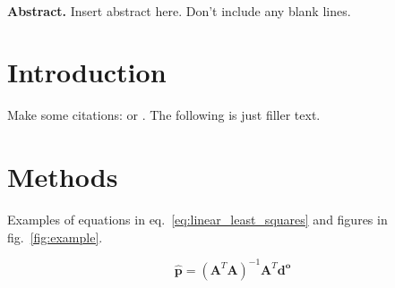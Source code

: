 \documentclass[9pt,twocolumn]{paper}
\begin{document}
\twocolumn[
  \begin{@twocolumnfalse}
    \noindent \textbf{\large \Title{}}
  \end{@twocolumnfalse}
  \vspace{0.7cm}
]
\noindent {\large \Name{}}
\\[0.2cm]
\noindent {\small \Affiliation{}}
\vspace{0.5cm}

\noindent
\textbf{Abstract.}
Insert abstract here. Don't include any blank lines.
\lipsum[1]

\section{Introduction}

Make some citations: \cite{Parker1973} or \citep{Parker1973}.
The following is just filler text.
\lipsum[1-4]


\section{Methods}

Examples of equations in eq.~\ref{eq:linear_least_squares} and figures in
fig.~\ref{fig:example}.

\begin{equation}
  \mathbf{\hat{p}} =
    \left(\mathbf{A}^T\mathbf{A}\right)^{-1}
    \mathbf{A}^T\mathbf{d^o}
  \label{eq:linear_least_squares}
\end{equation}
\end{document}
